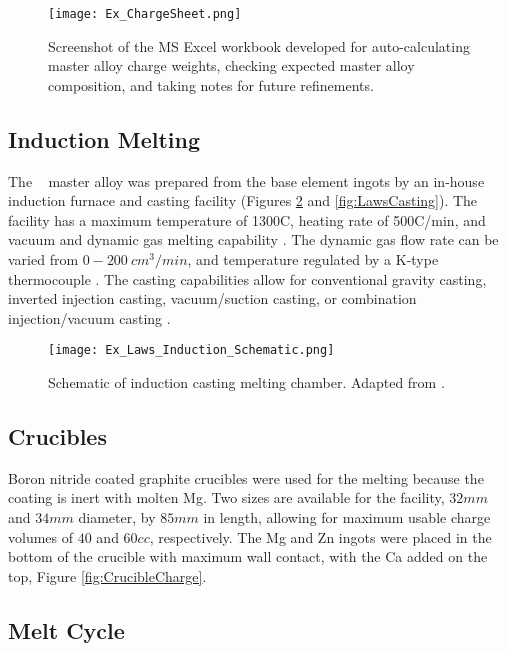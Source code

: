 \begin{figure}[htbp]
	\centering
	\texttt{[image: Ex\_ChargeSheet.png]}
	\caption{Screenshot of the MS Excel workbook developed for auto-calculating master alloy charge weights, checking expected master alloy composition, and taking notes for future refinements.}
	\label{fig:ChargeSheet}
\end{figure}

\subsection{Induction Melting}

The \MgZnCa~ master alloy was prepared from the base element ingots by an in-house induction furnace and casting facility (Figures \ref{fig:CastingSchematic} and \ref{fig:LawsCasting}). The facility has a maximum temperature of 1300\degree C, heating rate of 500\degree C/min, and vacuum and dynamic gas melting capability \cite{Laws2007}. The dynamic gas flow rate can be varied from $0-200~ cm^{3}/min$, and temperature regulated by a K-type thermocouple \cite{Laws2007}. The casting capabilities allow for conventional gravity casting, inverted injection casting, vacuum/suction casting, or combination injection/vacuum casting \cite{Laws2007}.

\begin{figure}[htbp]
	\centering
	\texttt{[image: Ex\_Laws\_Induction\_Schematic.png]}
	\caption[Schematic of induction casting melting chamber.]{Schematic of induction casting melting chamber. Adapted from \cite{Laws2007}.}
	\label{fig:CastingSchematic}
\end{figure}

\subsection{Crucibles}

Boron nitride coated graphite crucibles were used for the melting because the coating is inert with molten Mg. Two sizes are available for the facility, $32 mm$ and $34 mm$ diameter, by $85 mm$ in length, allowing for maximum usable charge volumes of $40$ and $60 cc$, respectively. The Mg and Zn ingots were placed in the bottom of the crucible with maximum wall contact, with the Ca added on the top, Figure \ref{fig:CrucibleCharge}.

\subsection{Melt Cycle}

